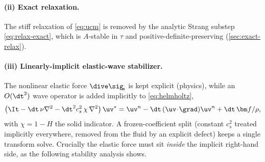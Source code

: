 \paragraph{(ii) Exact relaxation.} The stiff relaxation of \cref{eq:ucm} is removed by
the analytic Strang substep \cref{eq:relax-exact}, which is $A$-stable in $\tau$ and
positive-definite-preserving (\cref{sec:exact-relax}).

\paragraph{(iii) Linearly-implicit elastic-wave stabilizer.}
\label{sec:elastic-stab}
The nonlinear elastic force $\dive\sig_{\!s}$ is kept explicit (physics), while an
$O(\dt^2)$ wave operator is added implicitly to \cref{eq:helmholtz},
\begin{equation}
\left(\It-\dt\,\nu\nabla^2-\dt^2 c_s^2\,\chi\,\nabla^2\right)\uv^{*}
   = \uv^{n}-\dt\,(\uv\!\cdot\!\grad)\uv^{n}+\dt\,\bm f/\rho,
\label{eq:elastic-stab}
\end{equation}
with $\chi=1-H$ the solid indicator. A frozen-coefficient split (constant $c_s^2$
treated implicitly everywhere, removed from the fluid by an explicit defect) keeps a
single transform solve. Crucially the elastic force must sit \emph{inside} the implicit
right-hand side, as the following stability analysis shows.

